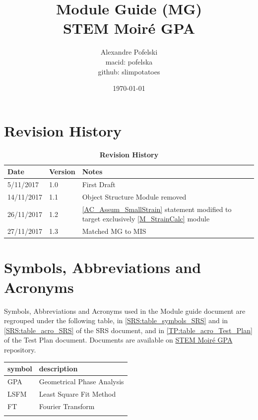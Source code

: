 \documentclass[12pt, titlepage]{article}
\newcommand{\progname}{STEM Moir{\'e} GPA}
\begin{document}
\title{Module Guide (MG) \\
STEM Moir{\'e} GPA} 
\author{Alexandre Pofelski \\
		macid: pofelska \\
		github: slimpotatoes}
\date{\today}

\maketitle


\section{Revision History}

\begin{table}[h]
\caption{\bf Revision History}
\begin{tabularx}{\textwidth}{p{3cm}p{2cm}X}
\toprule {\bf Date} & {\bf Version} & {\bf Notes}\\
\midrule
5/11/2017 & 1.0 & First Draft\\
14/11/2017 & 1.1 & Object Structure Module removed \\
26/11/2017 & 1.2 & \cref{AC_Assum_SmallStrain} statement modified to target exclusively \cref{M_StrainCalc} module\\
27/11/2017 & 1.3 & Matched MG to MIS \\
\bottomrule
\end{tabularx}
\end{table}

\newpage
\section{Symbols, Abbreviations and Acronyms}
\label{symbols}

Symbols, Abbreviations and Acronyms used in the Module guide document are regrouped under the following table, in \cref{SRS:table_symbols_SRS} and in \cref{SRS:table_acro_SRS} of the SRS document, and in \cref{TP:table_acro_Test_Plan} of the Test Plan document. Documents are available on \href{https://github.com/slimpotatoes/STEM_Moire_GPA}{\progname{}} repository. \par\bigskip

\renewcommand{\arraystretch}{1.2}
\begin{tabular}{l l} 
  \toprule		
  \textbf{symbol} & \textbf{description}\\
  \midrule 
  GPA & Geometrical Phase Analysis \\
  LSFM & Least Square Fit Method \\
  FT & Fourier Transform \\
  \bottomrule
  \label{table_acro_Test_Plan}
\end{tabular}
\end{document}
